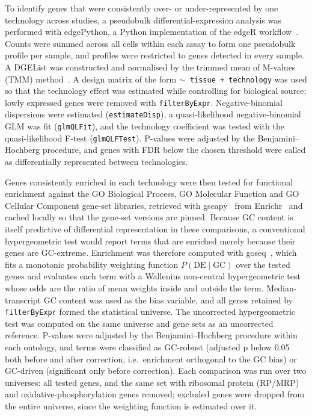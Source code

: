 To identify genes that were consistently over- or under-represented by one technology
across studies, a pseudobulk differential-expression analysis was performed with
edgePython, a Python implementation of the edgeR
workflow~\cite{robinson2010edger,chen2016edger}. Counts were summed across all cells
within each assay to form one pseudobulk profile per sample, and profiles were
restricted to genes detected in every sample. A DGEList was constructed and normalised
by the trimmed mean of M-values (TMM) method~\cite{robinson2010tmm}. A design matrix of the form
\texttt{$\sim$ tissue + technology} was used so that the technology effect was
estimated while controlling for biological source; lowly expressed genes were removed
with \texttt{filterByExpr}. Negative-binomial dispersions were estimated
(\texttt{estimateDisp}), a quasi-likelihood negative-binomial GLM was fit
(\texttt{glmQLFit}), and the technology coefficient was tested with the
quasi-likelihood F-test (\texttt{glmQLFTest}). P-values were adjusted by the
Benjamini--Hochberg procedure, and genes with FDR below the chosen threshold were
called as differentially represented between technologies.

Genes consistently enriched in each technology were then tested for functional
enrichment against the GO Biological Process, GO Molecular Function and GO Cellular
Component gene-set libraries, retrieved with gseapy~\cite{fang2023gseapy} from
Enrichr~\cite{kuleshov2016enrichr} and cached locally so that the gene-set versions are
pinned. Because GC content is itself predictive of differential representation in these
comparisons, a conventional hypergeometric test would report terms that are enriched
merely because their genes are GC-extreme. Enrichment was therefore computed with
goseq~\cite{young2010goseq}, which fits a monotonic probability weighting function
$P(\text{DE} \mid \text{GC})$ over the tested genes and evaluates each term with a
Wallenius non-central hypergeometric test whose odds are the ratio of mean weights inside
and outside the term. Median-transcript GC content was used as the bias variable, and all
genes retained by \texttt{filterByExpr} formed the statistical universe. The uncorrected
hypergeometric test was computed on the same universe and gene sets as an
uncorrected reference. P-values were adjusted by the Benjamini--Hochberg procedure
within each ontology, and terms were classified as GC-robust (adjusted p below 0.05
both before and after correction, i.e.\ enrichment orthogonal to the GC bias) or
GC-driven (significant only before correction). Each comparison was run over two
universes: all tested genes, and the same set with ribosomal protein (RP/MRP) and
oxidative-phosphorylation genes removed; excluded genes were dropped from the entire
universe, since the weighting function is estimated over it.

